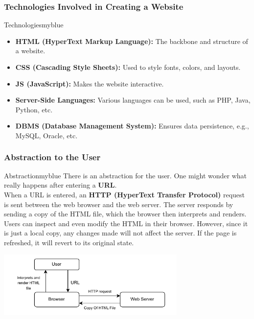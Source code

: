 \subsubsection{Technologies Involved in Creating a Website}
\begin{prettyBox}{Technologies}{myblue}
\begin{itemize}
    \item \textbf{HTML (HyperText Markup Language):} The backbone and structure of a website.
    \item \textbf{CSS (Cascading Style Sheets):} Used to style fonts, colors, and layouts.
    \item \textbf{JS (JavaScript):} Makes the website interactive.
    \item \textbf{Server-Side Languages:} Various languages can be used, such as PHP, Java, Python, etc.
    \item \textbf{DBMS (Database Management System):} Ensures data persistence, e.g., MySQL, Oracle, etc.
\end{itemize}
\end{prettyBox}

\vspace{1cm}


\subsubsection{Abstraction to the User}
\begin{prettyBox}{Abstraction}{myblue}
There is an abstraction for the user. One might wonder what really happens after entering a 
\textbf{URL}.\\[0.1cm]  
When a URL is entered, an \textbf{HTTP (HyperText Transfer Protocol)} request is sent between the web browser and the web server.
The server responds by sending a copy of the HTML file, which the browser then interprets and 
renders. Users can inspect and even modify the HTML in their browser. However, 
since it is just a local copy, any changes made will not affect the server. If the 
page is refreshed, it will revert to its original state.
\end{prettyBox}

\vspace{0.5cm}

\begin{center}
\includegraphics[width=0.7\textwidth]{Chapters/Diagram/Intro/web0.2.drawio.pdf}
\end{center}

